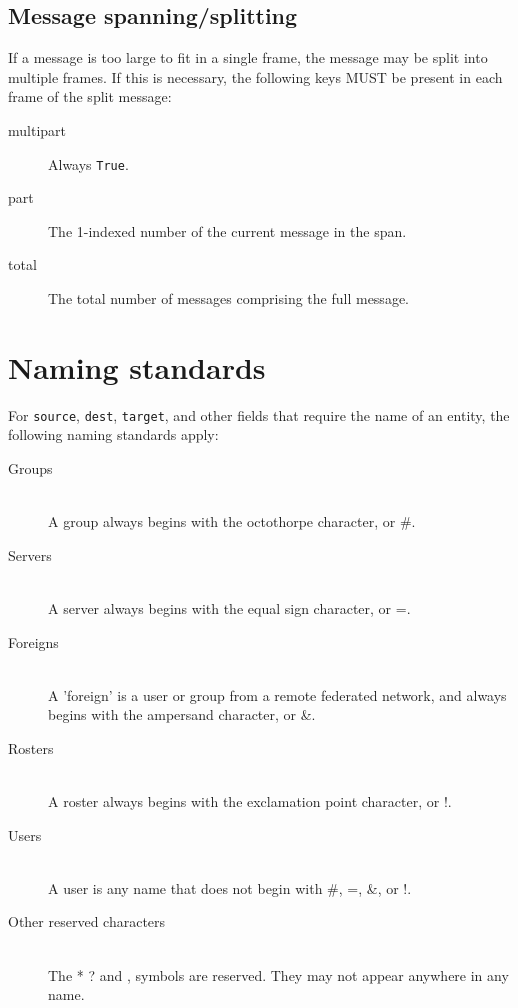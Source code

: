 \subsection{Message spanning/splitting}
\subsectionrule

If a message is too large to fit in a single frame, the message may be split
into multiple frames.  If this is necessary, the following keys MUST be present
in each frame of the split message:

\begin{description}
\item[\ttfamily multipart] Always \texttt{True}.
\item[\ttfamily part] The 1-indexed number of the current message in the span.
\item[\ttfamily total] The total number of messages comprising the full message.
\end{description}



\section{Naming standards}
\sectionrule
For \texttt{source}, \texttt{dest}, \texttt{target}, and other fields that
require the name of an entity, the following naming standards apply:

\begin{description}
\item[Groups] \hfill \\
A group always begins with the octothorpe character, or \#.

\item[Servers] \hfill \\
A server always begins with the equal sign character, or =.

\item[Foreigns] \hfill \\
A 'foreign' is a user or group from a remote federated network, and always
begins with the ampersand character, or \&.

\item[Rosters] \hfill \\
A roster always begins with the exclamation point character, or !.

\item[Users] \hfill \\
A user is any name that does not begin with \#, =, \&, or !.

\item[Other reserved characters] \hfill \\
The * ? and , symbols are reserved.  They may not appear anywhere in any name.

\end{description}

